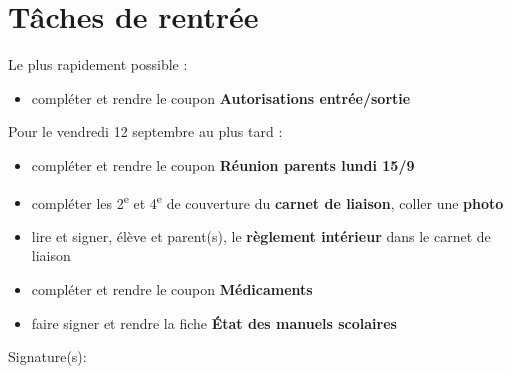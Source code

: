 \documentclass[10pt,a5paper]{article}
\begin{document}
\PfCPanneaux[FeuTricolore]
\section*{Tâches de rentrée}

\vspace{0.2em}
Le plus rapidement possible :

\begin{itemize}[leftmargin=1.5em, label=$\square$]
    \item compléter et rendre le coupon \textbf{Autorisations entrée/sortie}
\end{itemize}

\vspace{0.6em}
Pour le vendredi 12 septembre au plus tard :
\begin{itemize}[leftmargin=1.5em, label=$\square$]
\item  compléter et rendre le coupon \textbf{Réunion parents lundi 15/9}
\item  compléter les 2\textsuperscript{e} et 4\textsuperscript{e} de couverture du \textbf{carnet de liaison}, coller une \textbf{photo}
\item  lire et signer, élève et parent(s), le \textbf{règlement intérieur} dans le carnet de liaison
\item  compléter et rendre le coupon \textbf{Médicaments}
\item  faire signer et rendre la fiche \textbf{État des manuels scolaires}
\end{itemize}
\vspace{1em}
Signature(s):
\end{document}
